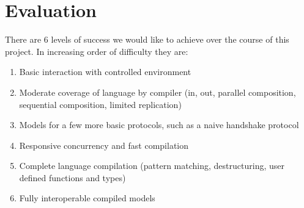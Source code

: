 \section{Evaluation}

There are 6 levels of success we would like to achieve over the course of this project. In increasing order of difficulty they are:
\begin{enumerate}
    \item Basic interaction with controlled environment
    \item Moderate coverage of language by compiler (in, out, parallel composition, sequential composition, limited replication) 
    \item Models for a few more basic protocols, such as a naive handshake protocol
    \item Responsive concurrency and fast compilation
    \item Complete language compilation (pattern matching, destructuring, user defined functions and types)
    \item Fully interoperable compiled models
\end{enumerate}
